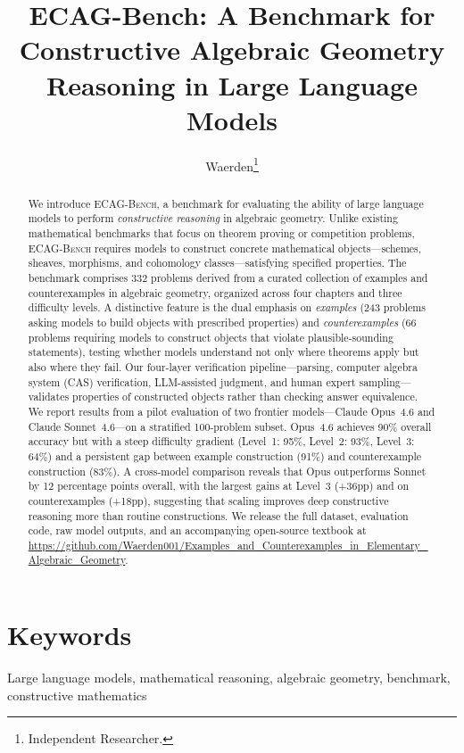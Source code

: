 \documentclass[11pt,a4paper]{article}
\title{ECAG-Bench: A Benchmark for Constructive Algebraic Geometry Reasoning in Large Language Models}
\author{
  Waerden\thanks{Independent Researcher.}
}
\date{}
\newcommand{\ecagbench}{\textsc{ECAG-Bench}}
\begin{document}
\maketitle

\begin{abstract}
We introduce \textsc{ECAG-Bench}, a benchmark for evaluating the ability of large language models to perform \emph{constructive reasoning} in algebraic geometry.
Unlike existing mathematical benchmarks that focus on theorem proving or competition problems, \ecagbench{} requires models to construct concrete mathematical objects---schemes, sheaves, morphisms, and cohomology classes---satisfying specified properties.
The benchmark comprises 332 problems derived from a curated collection of examples and counterexamples in algebraic geometry, organized across four chapters and three difficulty levels.
A distinctive feature is the dual emphasis on \emph{examples} (243 problems asking models to build objects with prescribed properties) and \emph{counterexamples} (66 problems requiring models to construct objects that violate plausible-sounding statements), testing whether models understand not only where theorems apply but also where they fail.
Our four-layer verification pipeline---parsing, computer algebra system (CAS) verification, LLM-assisted judgment, and human expert sampling---validates properties of constructed objects rather than checking answer equivalence.
We report results from a pilot evaluation of two frontier models---Claude Opus~4.6 and Claude Sonnet~4.6---on a stratified 100-problem subset.
Opus~4.6 achieves 90\% overall accuracy but with a steep difficulty gradient (Level~1: 95\%, Level~2: 93\%, Level~3: 64\%) and a persistent gap between example construction (91\%) and counterexample construction (83\%).
A cross-model comparison reveals that Opus outperforms Sonnet by 12 percentage points overall, with the largest gains at Level~3 (+36pp) and on counterexamples (+18pp), suggesting that scaling improves deep constructive reasoning more than routine constructions.
We release the full dataset, evaluation code, raw model outputs, and an accompanying open-source textbook at \url{https://github.com/Waerden001/Examples_and_Counterexamples_in_Elementary_Algebraic_Geometry}.
\end{abstract}

\section*{Keywords}
Large language models, mathematical reasoning, algebraic geometry, benchmark, constructive mathematics
\end{document}
